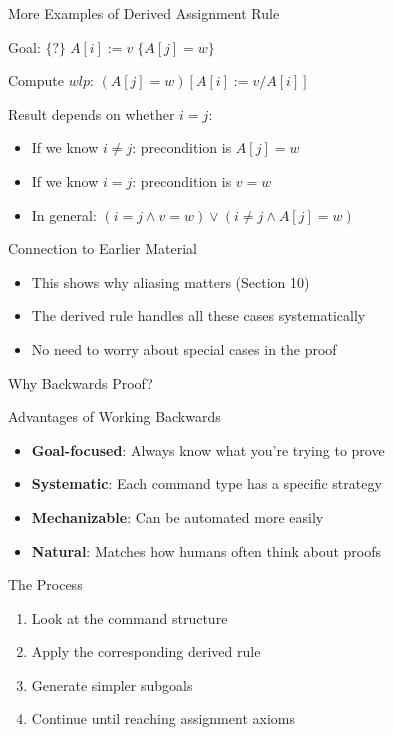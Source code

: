 \begin{frame}{More Examples of Derived Assignment Rule}
    \begin{example}
        Goal: $\{?\} \; A[i]:=v \; \{A[j]=w\}$
        
        Compute $wlp$: $(A[j]=w)[A[i]:=v/A[i]]$
        
        Result depends on whether $i=j$:
        \begin{itemize}
            \item If we know $i \neq j$: precondition is $A[j]=w$
            \item If we know $i = j$: precondition is $v=w$
            \item In general: $(i=j \wedge v=w) \vee (i \neq j \wedge A[j]=w)$
        \end{itemize}
    \end{example}
    
    \begin{block}{Connection to Earlier Material}
        \begin{itemize}
            \item This shows why aliasing matters (Section 10)
            \item The derived rule handles all these cases systematically
            \item No need to worry about special cases in the proof
        \end{itemize}
    \end{block}
\end{frame}

\begin{frame}{Why Backwards Proof?}
    \begin{block}{Advantages of Working Backwards}
        \begin{itemize}
            \item \textbf{Goal-focused}: Always know what you're trying to prove
            \item \textbf{Systematic}: Each command type has a specific strategy
            \item \textbf{Mechanizable}: Can be automated more easily
            \item \textbf{Natural}: Matches how humans often think about proofs
        \end{itemize}
    \end{block}
    
    \begin{block}{The Process}
        \begin{enumerate}
            \item Look at the command structure
            \item Apply the corresponding derived rule
            \item Generate simpler subgoals
            \item Continue until reaching assignment axioms
        \end{enumerate}
    \end{block}
\end{frame}
